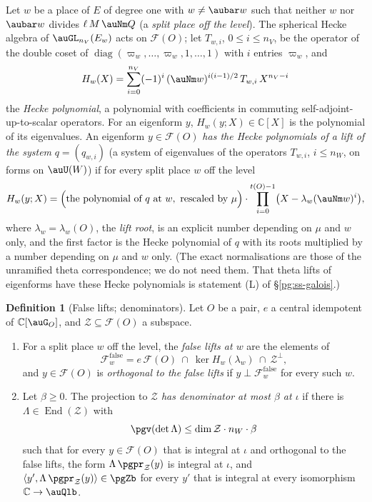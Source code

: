 \documentclass[10pt]{amsart}
\theoremstyle{definition}
\newtheorem{definition}[theorem]{Definition}
\theoremstyle{remark}
\newcommand{\C}{\mathbb C}
\begin{document}
Let $w$ be a place of $E$ of degree one with $w\ne\aubar w$ such that neither $w$ nor $\aubar w$
divides $\ell\,M\,\auNm Q$ (a \emph{split place off the level}). The spherical Hecke algebra of
$\auGL_{n_V}(E_w)$ acts on $\mathcal F(O)$; let $T_{w,i}$, $0\le i\le n_V$, be the operator of the
double coset of $\operatorname{diag}(\varpi_w,\dots,\varpi_w,1,\dots,1)$ with $i$ entries
$\varpi_w$, and
\[
H_w(X)=\sum_{i=0}^{n_V}(-1)^i\,(\auNm w)^{i(i-1)/2}\,T_{w,i}\,X^{n_V-i}
\]
the \emph{Hecke polynomial}, a polynomial with coefficients in commuting self-adjoint-up-to-scalar
operators. For an eigenform $y$, $H_w(y;X)\in\C[X]$ is the polynomial of its eigenvalues. An
eigenform $y\in\mathcal F(O)$ \emph{has the Hecke polynomials of a lift of the system}
$q=(q_{w,i})$ (a system of eigenvalues of the operators $T_{w,i}$, $i\le n_W$, on forms on
$\auU(W)$) if for every split place $w$ off the level
\begin{equation}\label{pg:eq-liftpoly}
H_w(y;X)=\Bigl(\text{the polynomial of }q\text{ at }w,\text{ rescaled by }\mu\Bigr)\cdot
\prod_{i=0}^{t(O)-1}\bigl(X-\lambda_w(\auNm w)^{i}\bigr),
\end{equation}
where $\lambda_w=\lambda_w(O)$, the \emph{lift root}, is an explicit number depending on $\mu$ and
$w$ only, and the first factor is the Hecke polynomial of $q$ with its roots multiplied by a
number depending on $\mu$ and $w$ only. (The exact normalisations are those of the unramified
theta correspondence; we do not need them. That theta lifts of eigenforms have these Hecke
polynomials is statement (L) of \S\ref{pg:ss-galois}.)

\begin{definition}[False lifts; denominators]\label{pg:def-den}
Let $O$ be a pair, $e$ a central idempotent of $\C[\auG_O]$, and $\mathcal Z\subseteq\mathcal F(O)$
a subspace.
\begin{enumerate}
\item[(a)] For a split place $w$ off the level, the \emph{false lifts at $w$} are the elements of
\[
\mathcal F^{\mathrm{false}}_w=e\,\mathcal F(O)\ \cap\ \ker H_w(\lambda_w)\ \cap\ \mathcal Z^{\perp},
\]
and $y\in\mathcal F(O)$ is \emph{orthogonal to the false lifts} if $y\perp\mathcal F^{\mathrm{
false}}_w$ for every such $w$.
\item[(b)] Let $\beta\ge0$. The projection to $\mathcal Z$ \emph{has denominator at most $\beta$ at
$\iota$} if there is $\Lambda\in\operatorname{End}(\mathcal Z)$ with
\[
\pgv(\det\Lambda)\le\dim\mathcal Z\cdot n_W\cdot\beta
\]
such that for every $y\in\mathcal F(O)$ that is integral at $\iota$ and orthogonal to the false
lifts, the form $\Lambda\,\pgpr_{\mathcal Z}(y)$ is integral at $\iota$, and
$\langle y',\Lambda\,\pgpr_{\mathcal Z}(y)\rangle\in\pgZb$ for every $y'$ that is integral at every
isomorphism $\C\to\auQlb$.
\end{enumerate}
\end{definition}
\end{document}
